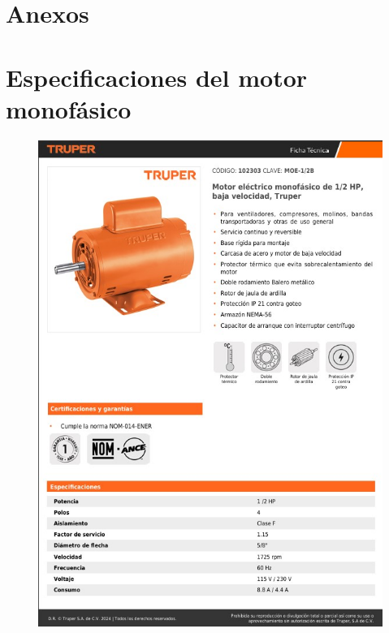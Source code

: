 \section*{Anexos}
\appendix
\section{Especificaciones del motor monofásico}
\begin{figure}[!htb]
    \centering
    \includegraphics[width=\linewidth]{imagenes/MotoresComercialesTruper1.jpg}
    \label{fig:DecayCurve}
\end{figure}


